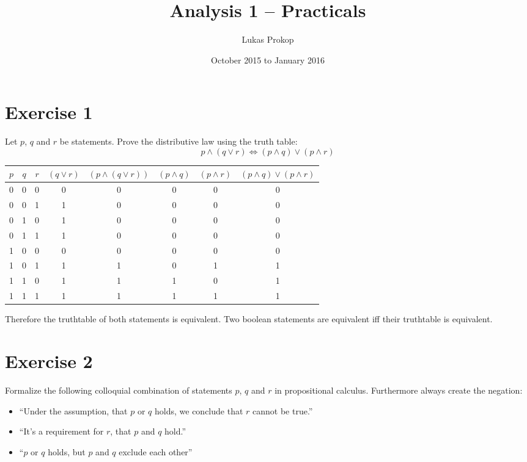 \documentclass[a4paper]{article}
\title{Analysis 1 -- Practicals}
\author{Lukas Prokop}
\date{October 2015 to January 2016}
\theoremstyle{definition}
\begin{document}
\maketitle
\tableofcontents

\clearpage
\section{Exercise 1}
\begin{ex}
  Let $p$, $q$ and $r$ be statements. Prove the distributive law using the truth table:
  \[ p \land (q \lor r) \Longleftrightarrow (p \land q) \lor (p \land r) \]
\end{ex}

\begin{table}[!h]
  \begin{center}
    \begin{tabular}{ccc|cc|ccc}
        $p$ & $q$ & $r$ & $(q \lor r)$ & $(p \land (q \lor r))$ & $(p \land q)$ & $(p \land r)$ & $(p \land q) \lor (p \land r)$ \\
      \hline
        0 & 0 & 0       & 0 & 0                                 & 0 & 0 & 0 \\
        0 & 0 & 1       & 1 & 0                                 & 0 & 0 & 0 \\
        0 & 1 & 0       & 1 & 0                                 & 0 & 0 & 0 \\
        0 & 1 & 1       & 1 & 0                                 & 0 & 0 & 0 \\
        1 & 0 & 0       & 0 & 0                                 & 0 & 0 & 0 \\
        1 & 0 & 1       & 1 & 1                                 & 0 & 1 & 1 \\
        1 & 1 & 0       & 1 & 1                                 & 1 & 0 & 1 \\
        1 & 1 & 1       & 1 & 1                                 & 1 & 1 & 1
    \end{tabular}
  \end{center}
\end{table}

Therefore the truthtable of both statements is equivalent.
Two boolean statements are equivalent iff their truthtable is equivalent.

\section{Exercise 2}
\begin{ex}
  Formalize the following colloquial combination of statements $p$, $q$ and $r$
  in propositional calculus. Furthermore always create the negation:
  \begin{itemize}
    \item \enquote{Under the assumption, that $p$ or $q$ holds, we conclude that $r$ cannot be true.}
    \item \enquote{It's a requirement for $r$, that $p$ and $q$ hold.}
    \item \enquote{$p$ or $q$ holds, but $p$ and $q$ exclude each other}
  \end{itemize}
\end{ex}
\end{document}
